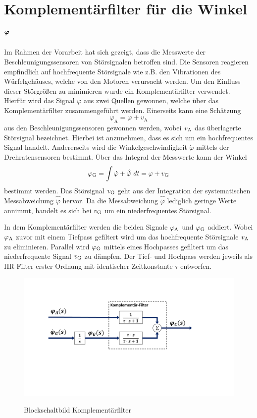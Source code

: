 \section{Komplementärfilter für die Winkel $\boldsymbol{\varphi}$}
Im Rahmen der Vorarbeit hat sich gezeigt, dass die Messwerte der Beschleunigungssensoren von Störsignalen betroffen sind. Die Sensoren reagieren empfindlich auf hochfrequente Störsignale wie z.B. den Vibrationen des Würfelgehäuses, welche von den Motoren verursacht werden. Um den Einfluss dieser Störgrößen zu minimieren wurde ein Komplementärfilter verwendet. Hierfür wird das Signal $\varphi$ aus zwei Quellen gewonnen, welche über das Komplementärfilter zusammengeführt werden. Einerseits kann eine Schätzung
\begin{equation}
\varphi_{\text{A}} = \varphi + v_{\text{A}}
\end{equation}
aus den Beschleunigungssensoren gewonnen werden, wobei $v_{\text{A}}$ das überlagerte Störsignal bezeichnet. Hierbei ist anzunehmen, dass es sich um ein hochfrequentes Signal handelt. Andererseits wird die Winkelgeschwindigkeit $\dot{\varphi}$ mittels der Drehratensensoren bestimmt. Über das Integral der Messwerte kann der Winkel
\begin{equation}
\varphi_{\text{G}} = \int \dot{\varphi} + \hat{\dot{\varphi}}\ dt = \varphi + v_{\text{G}} 
\end{equation}
bestimmt werden. Das Störsignal $v_{\text{G}}$ geht aus der Integration der systematischen Messabweichung $\hat{\dot{\varphi}}$ hervor. Da die Messabweichung $\hat{\dot{\varphi}}$ lediglich geringe Werte annimmt, handelt es sich bei $v_{\text{G}}$ um ein niederfrequentes Störsignal.

In dem Komplementärfilter werden die beiden Signale $\varphi_{\text{A}}$ und $\varphi_{\text{G}}$ addiert. Wobei $\varphi_{\text{A}}$ zuvor mit einem Tiefpass gefiltert wird um das hochfrequente Störsignale $v_{\text{A}}$ zu eliminieren. Parallel wird $\varphi_{\text{G}}$ mittels eines Hochpasses gefiltert um das niederfrequente Signal $v_{\text{G}}$ zu dämpfen. Der Tief- und Hochpass werden jeweils als IIR-Filter erster Ordnung mit identischer Zeitkonstante $\tau$ entworfen.
\begin{figure}[h!]
\includegraphics[width=1\linewidth, trim={2cm 7.5cm 4cm 3.5cm}, clip]{img/CompFilter}
\label{bsb_kompfilter}
\caption{Blockschaltbild Komplementärfilter}
\end{figure}

